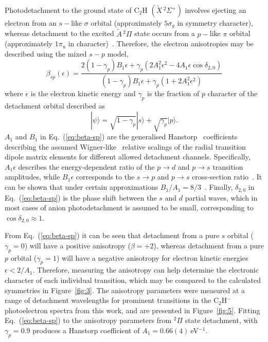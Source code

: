\documentclass[journal=jpcafh,manuscript=article,layout=onecolumn, 12pt]{achemso}
\begin{document}
Photodetachment to the ground state of C$_2$H $(\tilde{X}\,^2\Sigma^+)$ involves ejecting an electron from an $s-$like $\sigma$ orbital (approximately $5\sigma_g$ in symmetry character), whereas detachment to the excited $\tilde{A}\,^2\Pi$ state occurs from a $p-$like $\pi$ orbital (approximately $1\pi_u$ in character)~\cite{gul21}. Therefore, the electron anisotropies may be described using the mixed $s-p$ model\cite{khu14},
\begin{equation}
\beta_{sp}(\epsilon) = \frac{2(1-\gamma_p)B_1\epsilon + \gamma_p(2A_1^2\epsilon^2-4A_1\epsilon\cos\delta_{2,0})}
{(1-\gamma_p)B_1\epsilon+\gamma_p(1+2A_1^2\epsilon^2)}
\label{eq:beta-sp}
\end{equation}
where $\epsilon$ is the electron kinetic energy and $\gamma_p$ is the fraction of $p$ character of the detachment orbital described as
\begin{equation}
|\psi\rangle = \sqrt{1-\gamma_p}|s\rangle + \sqrt{\gamma_p}|p\rangle.
\end{equation}
$A_1$ and $B_1$ in Eq.~(\ref{eq:beta-sp}) are the generalised Hanstorp~\cite{han89} coefficients describing the assumed Wigner-like~\cite{wig48} relative scalings of the radial transition dipole matrix elements for different allowed detachment channels. Specifically, $A_1\epsilon$ describes the energy-dependent ratio of the $p\rightarrow d$ and $p\rightarrow s$ transition amplitudes, while $B_1\epsilon$ corresponds to the $s\rightarrow p$ and $p\rightarrow s$ cross-section ratio~\cite{khu14}. It can be shown that under certain approximations $B_1/A_1 = 8/3$~\cite{san13}. Finally, $\delta_{2,0}$ in Eq.~(\ref{eq:beta-sp}) is the phase shift between the $s$ and $d$ partial waves, which in most cases of anion photodetachment is assumed to be small, corresponding to $\cos\delta_{2,0}\approx1$.

From Eq.~(\ref{eq:beta-sp}) it can be seen that detachment from a pure $s$ orbital ($\gamma_p=0$) will have a positive anisotropy ($\beta = +2$), whereas detachment from a pure $p$ orbital ($\gamma_p=1$) will have a negative anisotropy for electron kinetic energies $\epsilon < 2/A_1$. Therefore, measuring the anisotropy can help determine the electronic character of each individual transition, which may be compared to the calculated symmetries in Figure~\ref{fig:3}. The anisotropy parameters were measured at a range of detachment wavelengths for prominent transitions in the C$_2$H$^-$ photoelectron spectra from this work, and are presented in Figure~\ref{fig:5}. Fitting Eq.~(\ref{eq:beta-sp}) to the anisotropy parameters from $^2\Pi$ state detachment, with $\gamma_p = 0.9$ produces a Hanstorp coefficient of $A_1=0.66(4)~$eV$^{-1}$.
\end{document}

